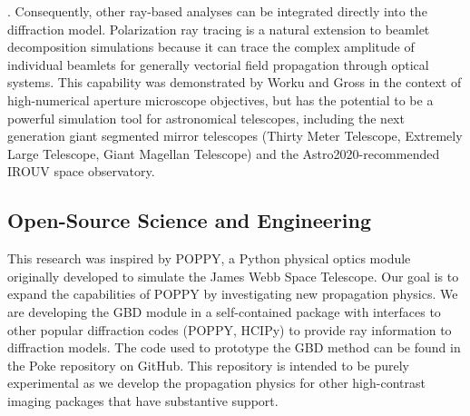 . Consequently, other ray-based analyses can be integrated directly into the diffraction model. Polarization ray tracing\cite{Chippman15} is a natural extension to beamlet decomposition simulations because it can trace the complex amplitude of individual beamlets for generally vectorial field propagation through optical systems. This capability was demonstrated by Worku and Gross\cite{Worku17} in the context of high-numerical aperture microscope objectives, but has the potential to be a powerful simulation tool for astronomical telescopes, including the next generation giant segmented mirror telescopes (Thirty Meter Telescope, Extremely Large Telescope, Giant Magellan Telescope)\cite{anche_inprep} and the Astro2020-recommended IROUV space observatory.

\subsection{Open-Source Science and Engineering}
This research was inspired by POPPY, a Python physical optics module originally developed to simulate the James Webb Space Telescope. Our goal is to expand the capabilities of POPPY by investigating new propagation physics. We are developing the GBD module in a self-contained package with interfaces to other popular diffraction codes (POPPY, HCIPy) to provide ray information to diffraction models. The code used to prototype the GBD method can be found in the Poke repository on GitHub\cite{Ashcraft_poke_2022}. This repository is intended to be purely experimental as we develop the propagation physics for other high-contrast imaging packages that have substantive support. 

\section{}
\label{sec:appendixA}


